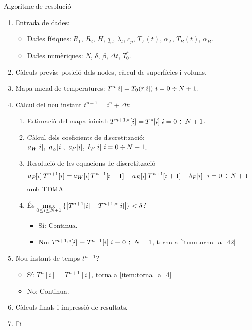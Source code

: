 \begin{algorithm}[ht]
	\caption{Algoritme de resolució}
	\begin{enumerate}[label=\textbf{\arabic*.}]
		\item Entrada de dades:
		\begin{itemize}
			\item Dades físiques: $R_1$, $R_2$, $H$, $\dot{q}_v$, $\lambda_t$, $c_p$, $T_A(t)$, $\alpha_A$, $T_B(t)$, $\alpha_B$.
			\item Dades numèriques: $N$, $\delta$, $\beta$, $\Delta t$, $T_0^\ast$.
		\end{itemize}
		\item Càlculs previs: posició dels nodes, càlcul de superfícies i volums.
		\item Mapa inicial de temperatures: $T^n[i] = T_0(r[i]) \ i = 0 \divisionsymbol N + 1$.
		\item Càlcul del nou instant $t^{n+1} = t^n + \Delta t$: \label{item:torna_a_4}
		\begin{enumerate}[label=\textbf{4.\arabic*.}]
			\item Estimació del mapa inicial: $T^{n+1,\ast}[i] = T^\ast[i] \ i = 0 \divisionsymbol N + 1$.
			\item Càlcul dels coeficients de discretització: $a_W[i], \ a_E[i], \ a_P[i], \ b_P[i] \ i = 0 \divisionsymbol N+1$. \label{item:torna_a_42}
			\item Resolució de les equacions de discretització
			\[
				a_P[i] \, T^{n+1}[i] =
				a_W[i] \, T^{n+1}[i-1] + a_E[i] \, T^{n+1}[i+1] + b_P[i] \ 
				\ 
				i = 0 \divisionsymbol N + 1
			\]
			amb TDMA.
			\item És $\displaystyle \max_{0 \leq i \leq N + 1}{\{ \abs{T^{n+1}[i] - T^{n+1,\ast}[i]} \}} < \delta$?
			\begin{itemize}
				\item Sí: Continua.
				\item No: $T^{n+1,\ast}[i] = T^{n+1}[i] \ i = 0 \divisionsymbol N + 1$, torna a \ref{item:torna_a_42}
			\end{itemize}
		\end{enumerate}
		\item Nou instant de temps $t^{n+1}$?
		\begin{itemize}
			\item Sí: $T^n[i] = T^{n+1}[i]$, torna a \ref{item:torna_a_4}
			\item No: Continua.
		\end{itemize}
		\item Càlculs finals i impressió de resultats.
		\item Fi
	\end{enumerate}
\end{algorithm}

